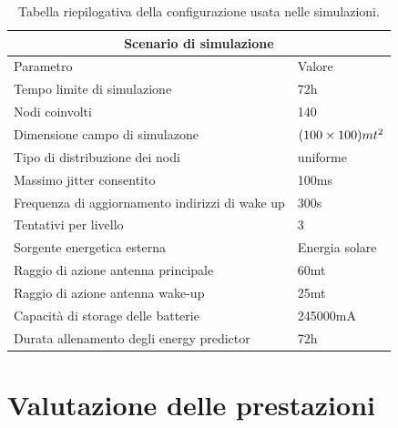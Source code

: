 \documentclass[binding=0.6cm,TFA]{sapthesis}
\begin{document}
\begin{table}[hb]
    \centering
    \caption{Tabella riepilogativa della configurazione usata nelle simulazioni.}
    \begin{tabular}{ |p{8cm}|p{3cm}|  }
        \hline
        \multicolumn{2}{|c|}{Scenario di simulazione}                                               \\
        \hline
        Parametro                                       & Valore                                    \\
        \hline
        Tempo limite di simulazione                     & 72h                                       \\
        Nodi coinvolti                                  & 140                                       \\
        Dimensione campo di simulazone                  & $(100 \times 100) mt\textsuperscript{2}$  \\
        Tipo di distribuzione dei nodi                  & uniforme                                  \\
        Massimo jitter consentito                       & 100ms                                     \\
        Frequenza di aggiornamento indirizzi di wake up & 300s                                      \\
        Tentativi per livello                           & 3                                         \\
        Sorgente energetica esterna                     & Energia solare                            \\
        Raggio di azione antenna principale             & 60mt                                      \\
        Raggio di azione antenna wake-up                & 25mt                                      \\
        Capacità di storage delle batterie              & 245000mA                                  \\
        Durata allenamento degli energy predictor       & 72h                                       \\
        \hline
    \end{tabular}
\end{table}

\section{Valutazione delle prestazioni}
\end{document}
